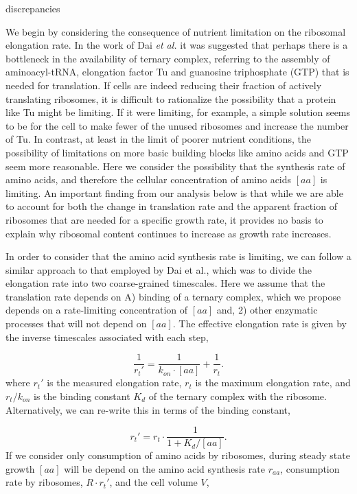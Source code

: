 discrepancies \documentclass[11pt, letterpaper]{article}
\begin{document}
We begin by considering the consequence of nutrient limitation on the ribosomal elongation rate. In the
work of  Dai {\it et al.} it was suggested that perhaps there is a bottleneck in
the availability of ternary complex, referring to the assembly of
aminoacyl-tRNA,  elongation factor Tu and guanosine triphosphate (GTP) that is
needed for translation.  If cells are indeed  reducing their fraction of
actively translating ribosomes, it is difficult to rationalize the possibility
that a protein like Tu might be limiting. If it were limiting, for example, a
simple solution seems to be for the cell to make  fewer of the unused ribosomes
and increase the number of Tu. In contrast, at least in the limit  of poorer
nutrient conditions, the possibility of limitations on more basic building blocks like amino
acids  and GTP seem more reasonable. Here we consider the possibility that the
synthesis rate of  amino acids, and therefore the cellular concentration of
amino acids $[aa]$ is limiting. An important finding from our analysis below is
that while we are able to account for both the change in translation rate and
the apparent fraction of ribosomes that are needed for a specific growth rate, it provides no
basis to explain why ribosomal content continues to increase as growth rate increases.

In order to consider that the amino acid synthesis rate is limiting, we can
follow a similar approach to that employed by Dai et al., which was to divide
the elongation rate into two coarse-grained timescales. Here we assume that  the
translation rate depends on A) binding of a ternary complex, which we propose
depends on a rate-limiting concentration of $[aa]$ and, 2) other enzymatic
processes that will not depend on $[aa]$. The effective elongation rate is given
by the inverse timescales associated with each step,

\begin{equation}
\frac{1}{r_t'} = \frac{1}{k_{on} \cdot [aa]} + \frac{1}{r_t}.
\label{eq:rate_dai_2}
\end{equation}
where $r_t'$ is the measured elongation rate, $r_t$ is the maximum elongation
rate, and $r_t/k_{on}$ is the binding constant $K_d$ of the ternary complex with
the ribosome. Alternatively, we can re-write this in terms of the binding
constant,

\begin{equation}
r_t' = r_t \cdot \frac{1}{1 + K_d / [aa]}.
\label{eq:rate_aa}
\end{equation}
If we consider only consumption of amino acids by ribosomes, during steady state growth $[aa]$ will be depend on the amino
acid synthesis rate $r_{aa}$, consumption rate by ribosomes, $R \cdot r_t'$,  and the cell volume $V$,
\end{document}
